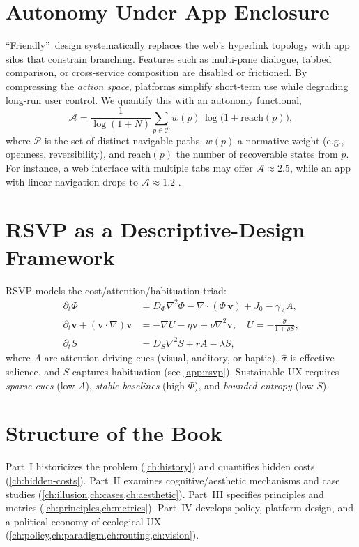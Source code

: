 \documentclass[openany]{book}
\newcommand{\PhiS}{\Phi} %
\newcommand{\vvec}{\mathbf{v}} %
\newcommand{\Sent}{S} %
\newcommand{\Auton}{\mathcal{A}} %
\begin{document}
\section{Autonomy Under App Enclosure}
\label{sec:intro-autonomy}
\textquotedblleft Friendly\textquotedblright\ design systematically replaces the web's hyperlink topology with app silos that constrain branching. Features such as multi-pane dialogue, tabbed comparison, or cross-service composition are disabled or frictioned. By compressing the \emph{action space}, platforms simplify short-term use while degrading long-run user control. We quantify this with an autonomy functional,
\begin{equation}
\label{eq:autonomy}
\Auton = \frac{1}{\log(1+N)}\sum_{p\in \mathcal{P}} w(p)\,\log\big(1+\mathrm{reach}(p)\big),
\end{equation}
where $\mathcal{P}$ is the set of distinct navigable paths, $w(p)$ a normative weight (e.g., openness, reversibility), and $\mathrm{reach}(p)$ the number of recoverable states from $p$. For instance, a web interface with multiple tabs may offer $\Auton \approx 2.5$, while an app with linear navigation drops to $\Auton \approx 1.2$ \citep{doctorow2022}.

\section{RSVP as a Descriptive-Design Framework}
\label{sec:intro-rsvp}
RSVP models the cost/attention/habituation triad:
\begin{align}
\partial_t \PhiS &= D_\Phi \nabla^2 \PhiS - \nabla \cdot (\PhiS\,\vvec) + J_0 - \gamma_A A, \label{eq:intro-phi}\\[2pt]
\partial_t \vvec + (\vvec \cdot \nabla)\vvec &= -\nabla U - \eta \vvec + \nu\nabla^2\vvec, \quad U=-\frac{\widehat{\sigma}}{1+\rho \Sent}, \label{eq:intro-v}\\[2pt]
\partial_t \Sent &= D_S \nabla^2 \Sent + r A - \lambda \Sent, \label{eq:intro-S}
\end{align}
where $A$ are attention-driving cues (visual, auditory, or haptic), $\widehat{\sigma}$ is effective salience, and $\Sent$ captures habituation (see \cref{app:rsvp}). Sustainable UX requires \emph{sparse cues} (low $A$), \emph{stable baselines} (high $\PhiS$), and \emph{bounded entropy} (low $\Sent$).

\section{Structure of the Book}
\label{sec:intro-structure}
Part~I historicizes the problem (\cref{ch:history}) and quantifies hidden costs (\cref{ch:hidden-costs}). Part~II examines cognitive/aesthetic mechanisms and case studies (\cref{ch:illusion,ch:cases,ch:aesthetic}). Part~III specifies principles and metrics (\cref{ch:principles,ch:metrics}). Part~IV develops policy, platform design, and a political economy of ecological UX (\cref{ch:policy,ch:paradigm,ch:routing,ch:vision}).
\end{document}
